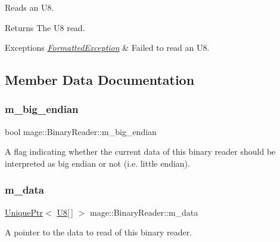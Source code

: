 Reads an {\ttfamily U8}.

\begin{DoxyReturn}{Returns}
The {\ttfamily U8} read. 
\end{DoxyReturn}

\begin{DoxyExceptions}{Exceptions}
{\em \hyperlink{classmage_1_1_formatted_exception}{Formatted\+Exception}} & Failed to read an {\ttfamily U8}. \\
\hline
\end{DoxyExceptions}


\subsection{Member Data Documentation}
\hypertarget{classmage_1_1_binary_reader_a8d23fde958e08efe248edb5d92861113}{}\label{classmage_1_1_binary_reader_a8d23fde958e08efe248edb5d92861113} 
\subsubsection{\texorpdfstring{m\+\_\+big\+\_\+endian}{m\_big\_endian}}
{\footnotesize\ttfamily bool mage\+::\+Binary\+Reader\+::m\+\_\+big\+\_\+endian\hspace{0.3cm}{\ttfamily [private]}}

A flag indicating whether the current data of this binary reader should be interpreted as big endian or not (i.\+e. little endian). \hypertarget{classmage_1_1_binary_reader_a529bdcb620e1250aa0b12716c9b7eae1}{}\label{classmage_1_1_binary_reader_a529bdcb620e1250aa0b12716c9b7eae1} 
\subsubsection{\texorpdfstring{m\+\_\+data}{m\_data}}
{\footnotesize\ttfamily \hyperlink{namespacemage_a3316d7143a973e37adf1110f2e80ca31}{Unique\+Ptr}$<$ \hyperlink{namespacemage_afc638980bc6154f15af5e2d93a0e0ea9}{U8}\mbox{[}$\,$\mbox{]} $>$ mage\+::\+Binary\+Reader\+::m\+\_\+data\hspace{0.3cm}{\ttfamily [private]}}

A pointer to the data to read of this binary reader. \hypertarget{classmage_1_1_binary_reader_a19b0f36cb1e8a05aaa9471514242e8ef}{}\label{classmage_1_1_binary_reader_a19b0f36cb1e8a05aaa9471514242e8ef} 
